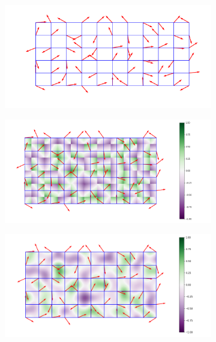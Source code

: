 \documentclass[12pt,a4paper]{report}
\begin{document}
    \begin{figure}
        \centering
        \begin{subfigure}[b]{0.3\textwidth}
             \centering
             \includegraphics[width = \textwidth]{images/grid_grad}
             \caption{}
             \label{fig:grid_grad}
        \end{subfigure}
        \hfill
        \begin{subfigure}[b]{0.3\textwidth}
             \centering
             \includegraphics[width = \textwidth]{images/PerlinNoiseDotProducts}
             \caption{}
             \label{fig:dot_prod}
        \end{subfigure}
        \hfill
        \begin{subfigure}[b]{0.3\textwidth}
             \centering
             \includegraphics[width = \textwidth]{images/PerlinNoiseInterpolated}

\end{subfigure}
\end{figure}
\end{document}
